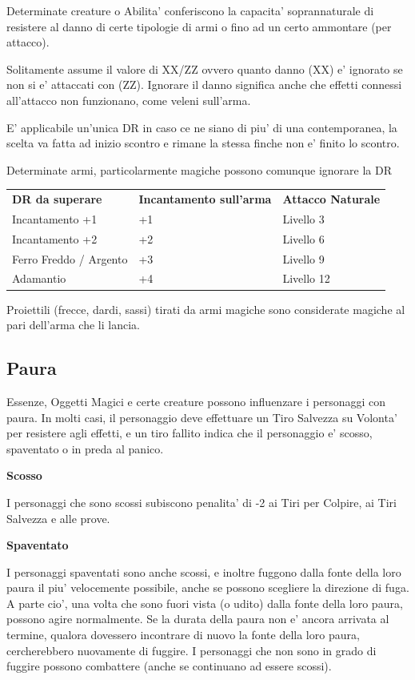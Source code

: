 \documentclass[a4paper,11pt,twoside,openany]{book}
\begin{document}
{Determinate creature o Abilita' conferiscono la capacita' soprannaturale di resistere al danno di certe tipologie di armi o fino ad un certo ammontare (per attacco).

Solitamente assume il valore di XX/ZZ ovvero quanto danno (XX) e' ignorato se non si e' attaccati con (ZZ). Ignorare il danno significa anche che effetti connessi all'attacco non funzionano, come veleni sull'arma.

E' applicabile un'unica DR in caso ce ne siano di piu' di una contemporanea, la scelta va fatta ad inizio scontro e rimane la stessa finche non e' finito lo scontro.

Determinate armi, particolarmente magiche possono comunque ignorare la DR 

\bigskip

\begin{tabular}{lll}
\toprule
\textbf{DR da superare} & \textbf{Incantamento sull'arma} & \textbf{Attacco Naturale}\tabularnewline
Incantamento +1 & +1 & Livello 3\tabularnewline
Incantamento +2 & +2 & Livello 6\tabularnewline
Ferro Freddo / Argento & +3 & Livello 9\tabularnewline
Adamantio & +4 & Livello 12\tabularnewline

\end{tabular}

Proiettili (frecce, dardi, sassi) tirati da armi magiche sono considerate
magiche al pari dell'arma che li lancia.



\subsection{Paura}

\label{paura}

Essenze, Oggetti Magici e certe creature possono influenzare i personaggi con paura. In molti casi, il personaggio deve effettuare un Tiro Salvezza su Volonta' per resistere agli effetti, e un tiro fallito indica che il personaggio e' scosso, spaventato o in preda al panico.

\textbf{Scosso}

I personaggi che sono scossi subiscono penalita' di -2 ai Tiri per Colpire, ai Tiri Salvezza e alle prove.

\textbf{Spaventato}

I personaggi spaventati sono anche scossi, e inoltre fuggono dalla fonte della loro paura il piu' velocemente possibile, anche se possono scegliere la direzione di fuga. A parte cio', una volta che sono fuori vista (o udito) dalla fonte della loro paura, possono agire normalmente. Se la durata della paura non e' ancora arrivata al termine, qualora dovessero incontrare di nuovo la fonte della loro paura, cercherebbero nuovamente di fuggire. I personaggi che non sono in grado di fuggire possono combattere (anche se continuano ad essere scossi).

}
\end{document}
